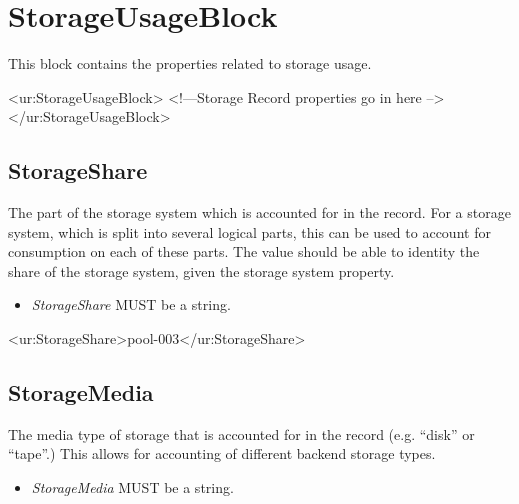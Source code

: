 
\section{StorageUsageBlock}

This block contains the properties related to storage usage.

\begin{XMLexample}
<ur:StorageUsageBlock>
<!—Storage Record properties go in here -->
</ur:StorageUsageBlock>
\end{XMLexample}






\subsection{StorageShare}

The part of the storage system which is accounted for in the record. For a storage system, which is split into several logical parts, this can be used to account for consumption on each of these parts. The value should be able to identity the share of the storage system, given the storage system property.

\begin{itemize}
\item \emph{StorageShare} MUST be a string.
\end{itemize}

\begin{XMLexample}
<ur:StorageShare>pool-003</ur:StorageShare>
\end{XMLexample}






\subsection{StorageMedia}

The media type of storage that is accounted for in the record (e.g. ``disk'' or ``tape''.) This allows for accounting of different backend storage types. 


\begin{itemize}
\item \emph{StorageMedia} MUST be a string.
\end{itemize}

